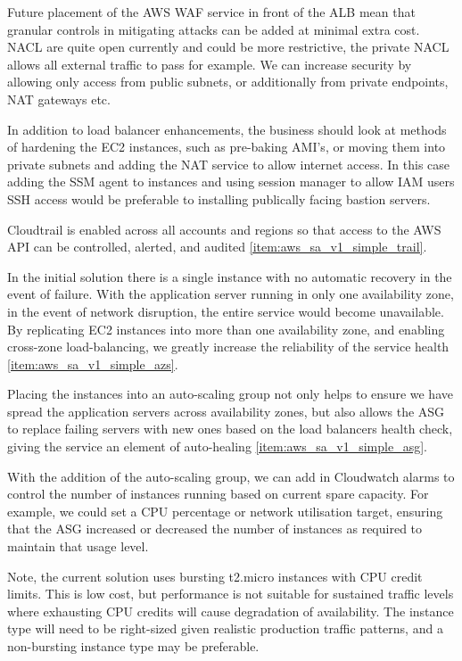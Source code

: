 Future placement of the AWS WAF service in front of the ALB mean that granular controls in mitigating attacks can be added at minimal extra cost. NACL are quite open currently and could be more restrictive, the private NACL allows all external traffic to pass for example. We can increase security by allowing only access from public subnets, or additionally from private endpoints, NAT gateways etc. 

In addition to load balancer enhancements, the business should look at methods of hardening the EC2 instances, such as pre-baking AMI's, or moving them into private subnets and adding the NAT service to allow internet access. In this case adding the SSM agent to instances and using session manager to allow IAM users SSH access would be preferable to installing publically facing bastion servers.

Cloudtrail is enabled across all accounts and regions so that access to the AWS API can be controlled, alerted, and audited \ref{item:aws_sa_v1_simple_trail}.


In the initial solution there is a single instance with no automatic recovery in the event of failure. With the application server running in only one availability zone, in the event of network disruption, the entire service would become unavailable. By replicating EC2 instances into more than one availability zone, and enabling cross-zone load-balancing, we greatly increase the reliability of the service health \ref{item:aws_sa_v1_simple_azs}.

Placing the instances into an auto-scaling group not only helps to ensure we have spread the application servers across availability zones, but also allows the ASG to replace failing servers with new ones based on the load balancers health check, giving the service an element of auto-healing \ref{item:aws_sa_v1_simple_asg}.


With the addition of the auto-scaling group, we can add in Cloudwatch alarms to control the number of instances running based on current spare capacity. For example, we could set a CPU percentage or network utilisation target, ensuring that the ASG increased or decreased the number of instances as required to maintain that usage level.

Note, the current solution uses bursting t2.micro instances with CPU credit limits. This is low cost, but performance is not suitable for sustained traffic levels where exhausting CPU credits will cause degradation of availability. The instance type will need to be right-sized given realistic production traffic patterns, and a non-bursting instance type may be preferable.

